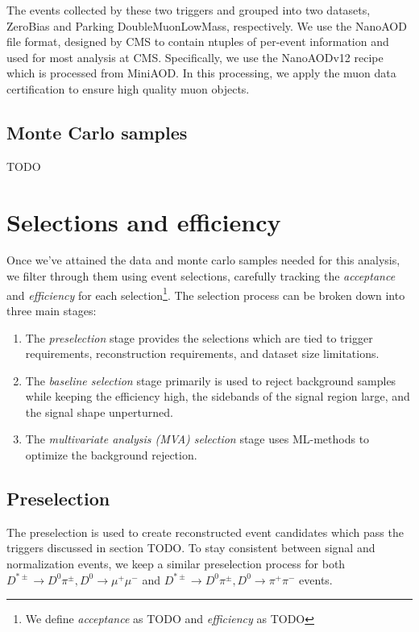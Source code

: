 The events collected by these two triggers and grouped into two datasets, ZeroBias and Parking DoubleMuonLowMass, respectively. We use the NanoAOD file format, designed by CMS to contain ntuples of per-event information and used for most analysis at CMS. Specifically, we use the NanoAODv12 recipe which is processed from MiniAOD. In this processing, we apply the muon data certification to ensure high quality muon objects. 

\subsection{Monte Carlo samples}

TODO

\section{Selections and efficiency}

Once we've attained the data and monte carlo samples needed for this analysis, we filter through them using event selections, carefully tracking the \textit{acceptance} and \textit{efficiency} for each selection\footnote{We define \textit{acceptance} as TODO and \textit{efficiency} as TODO}. The selection process can be broken down into three main stages:
\begin{enumerate}
    \item The \textit{preselection} stage provides the selections which are tied to trigger requirements, reconstruction requirements, and dataset size limitations.
    \item The \textit{baseline selection} stage primarily is used to reject background samples while keeping the efficiency high, the sidebands of the signal region large, and the signal shape unperturned. 
    \item The \textit{multivariate analysis (MVA) selection} stage uses ML-methods to optimize the background rejection.
\end{enumerate}

\subsection{Preselection}

The preselection is used to create reconstructed event candidates which pass the triggers discussed in section TODO. To stay consistent between signal and normalization events, we keep a similar preselection process for both $D^{*\pm} \to D^0 \pi^\pm, D^0 \to \mu^+ \mu^-$ and $D^{*\pm} \to D^0 \pi^\pm, D^0 \to \pi^+ \pi^-$ events.

